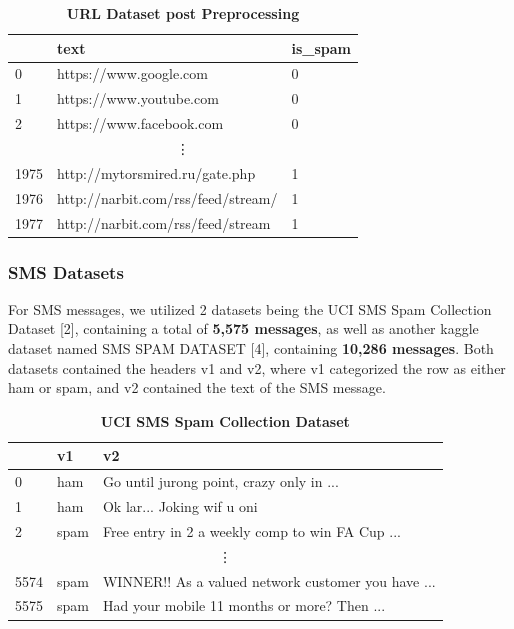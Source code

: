 \documentclass{article}
\begin{document}
\begin{table}[htbp]
    \centering
    \caption{\textbf{URL Dataset post Preprocessing}}
    \begin{tabular}{lll}
    \toprule
     & text & is\_spam \\
    \midrule
    0 & https://www.google.com & 0 \\
    1 & https://www.youtube.com & 0 \\
    2 & https://www.facebook.com & 0 \\
    \multicolumn{3}{c}{\vdots} \\ %
    1975 & http://mytorsmired.ru/gate.php & 1 \\
    1976 & http://narbit.com/rss/feed/stream/ & 1 \\
    1977 & http://narbit.com/rss/feed/stream & 1 \\
    \bottomrule
    \end{tabular}
    \label{tab:csv_sample}
\end{table}

\subsubsection{SMS Datasets}
For SMS messages, we utilized 2 datasets being the UCI SMS Spam Collection Dataset [2], containing a total of \textbf{5,575 messages}, as well as another kaggle dataset named SMS SPAM DATASET [4], containing \textbf{10,286 messages}. Both datasets contained the headers v1 and v2, where v1 categorized the row as either ham or spam, and v2 contained the text of the SMS message.

\begin{table}[htbp]
    \centering
    \caption{\textbf{UCI SMS Spam Collection Dataset}}
    \begin{tabular}{lll}
    \toprule
     & v1 & v2 \\
    \midrule
    0 & ham & Go until jurong point, crazy only in ... \\
    1 & ham & Ok lar... Joking wif u oni \\
    2 & spam & Free entry in 2 a weekly comp to win FA Cup ... \\
    \multicolumn{3}{c}{\vdots} \\ %
    5574 & spam & WINNER!! As a valued network customer you have ... \\
    5575 & spam & Had your mobile 11 months or more? Then ... \\
    \bottomrule
    \end{tabular}
    \label{tab:csv_sample}
\end{table}
\end{document}
